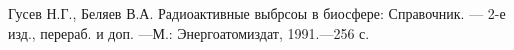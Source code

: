 \begin{thebibliography}{9}
	 Гусев Н.Г., Беляев В.А. Радиоактивные выбрсоы в биосфере: Справочник. --- 2-е изд., перераб. и доп.
	---М.: Энергоатомиздат, 1991.---256 с.
\end{thebibliography}